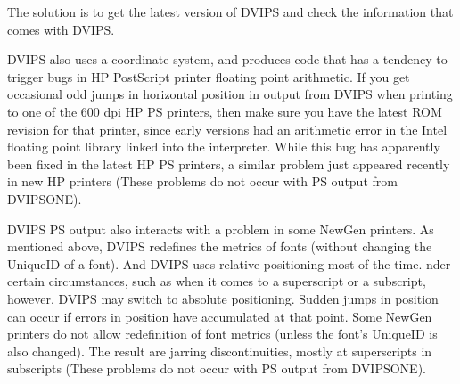 The solution is to get the latest version of DVIPS
and check the information that comes with DVIPS.


% 



DVIPS also uses a %
coordinate system, and produces code that has a
tendency to trigger bugs in HP PostScript printer floating point arithmetic.
If you get occasional odd jumps in horizontal position in output from DVIPS
when printing to one of the 600 dpi HP PS printers, then make sure you have
the latest ROM revision for that printer, since early versions had an
arithmetic error in the Intel floating point library linked into the
interpreter.  While this bug has apparently been fixed in the latest HP PS
printers, a similar problem just appeared recently in new HP printers 
(These problems do not occur with PS output from DVIPSONE). 

DVIPS PS output also interacts with a problem in some NewGen printers.
As mentioned above, DVIPS redefines the metrics of fonts (without changing
the UniqueID of a font).  And DVIPS uses relative positioning most of 
the time.  nder certain circumstances, such as when it comes to a superscript
or a subscript, however, DVIPS may switch to absolute positioning.  Sudden
jumps in position can occur if errors in position have accumulated at that
point.  Some NewGen printers do not allow redefinition of font metrics
(unless the font's UniqueID is also changed). 
The result are jarring discontinuities, mostly at superscripts in subscripts
(These problems do not occur with PS output from DVIPSONE).

